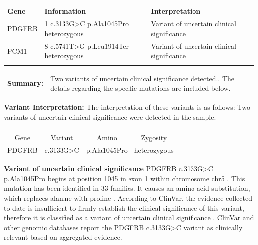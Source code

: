 \documentclass[11pt]{extarticle}
\begin{document}
\begin{tabularx}{\textwidth}{Z|Y|X}
{\bf \large Gene} & {\bf \large Information} & {\bf \large Interpretation} \\
\hline

PDGFRB & 1 c.3133G>C p.Ala1045Pro heterozygous & Variant of uncertain clinical significance \\ 
 
PCM1 & 8 c.5741T>G p.Leu1914Ter heterozygous & Variant of uncertain clinical significance \\ 
 
&& \\
\end{tabularx}
\vspace{3em}

\begin{tabularx}{\textwidth}{S X}
{\bf \large Summary: } & Two variants of uncertain clinical significance detected.. The details regarding the specific mutations are included below. 
\end{tabularx}

\newpage
\vspace{2em}
{\Huge \bf Variant Interpretation: } 
\newline
\newline The interpretation of these variants is as follows: Two variants of uncertain clinical significance   were detected in the sample. 

 \vspace{2em}{\bf \large Variant 1 of 2 }
      \newline \vspace{2em} \begin{tabularx}{\textwidth}{C C C C} 
 &&&\\ Gene & Variant & Amino & Zygosity\\ PDGFRB  &  c.3133G>C & p.Ala1045Pro  &  heterozygous 
\end{tabularx} \vspace{2em} {\bf Variant of uncertain clinical significance } \newline
PDGFRB c.3133G>C p.Ala1045Pro begins at position 1045 in exon  1 within chromosome  chr5 . This mutation has been 
      identified in  33 families.  It 
causes an amino acid substitution, which replaces alanine with proline .
According to ClinVar, the evidence collected to date is insufficient to firmly establish the clinical significance of this variant, therefore it is classified as a variant of uncertain clinical significance .
ClinVar and other genomic databases report the PDGFRB c.3133G>C variant as clinically relevant based on aggregated evidence. 
\end{document}
